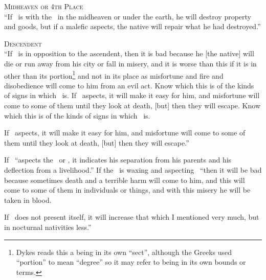\noindent\textsc{Midheaven or 4th Place} \hfill \\
\indent ``If \Mars\, is with the \Moon\, in the midheaven or under the earth, he will destroy property and goods, but if a malefic aspects, the native will repair what he had destroyed.''

\noindent\textsc{Descendent} \hfill \\
\indent ``If \Mars\, is in opposition to the ascendent, then it is bad because he [the native] will die or run away from his city or fall in misery, and it is worse than this if it is in other than its portion\footnote{Dykes reads this a being in its own ``sect'', although the Greeks used ``portion'' to mean ``degree'' so it may refer to being in its own bounds or terms.} and not in its place as misfortune and fire and disobedience will come to him from an evil act. Know which this is of the kinds of signs in which \Mars\, is. If \Jupiter\,  aspects, it will make it easy for him, and misfortune will come to some of them until they look at death, [but] then they will escape. Know which this is of the kinds of signs in which \Mars\, is.

If \Jupiter\, aspects, it will make it easy for him, and misfortune will come to some of them until they look at death, [but] then they will escape.''

If \Mars\, ``aspects the \Sun\, or \Moon, it indicates his separation from his parents and his deflection from a livelihood.'' If the \Moon\, is waxing and aspecting \Mars\, ``then it will be bad because sometimes death and a terrible harm will come to him, and this will come to some of them in individuals or things, and with this misery he will be taken in blood.

If \Jupiter\, does not present itself, it will increase that which I mentioned very much, but in nocturnal nativities less.''


